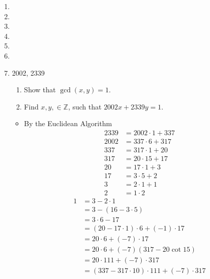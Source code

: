 \documentclass{article}
\begin{document}
\begin{enumerate}[label = \textbf{\alph*)}]
	\item
	\item
	\item
	\item
	\item
	\item
	\item 2002, 2339
	      \begin{enumerate}
		      \item Show that $ \gcd(x, y) = 1 $.
		      \item Find $ x, y, \in \mathbb{Z} $, such that $ 2002x + 2339y = 1 $.
	      \end{enumerate}
	      \begin{itemize}
		      \item By the Euclidean Algorithm
		            \begin{align*}
			            2339 & = 2002 \cdot 1 + 337 \\
			            2002 & = 337 \cdot 6 + 317  \\
			            337  & = 317 \cdot 1 + 20   \\
			            317  & = 20 \cdot 15 + 17   \\
			            20   & = 17 \cdot 1 + 3     \\
			            17   & = 3 \cdot 5 + 2      \\
			            3    & = 2 \cdot 1 + 1      \\
			            2    & = 1 \cdot 2
		            \end{align*}
		            \begin{align*}
			            1 & = 3 - 2 \cdot 1                                       \\
			              & = 3 - (16 - 3 \cdot 5)                                \\
			              & = 3 \cdot 6 - 17                                      \\
			              & = (20 - 17 \cdot 1) \cdot 6 + (-1) \cdot 17           \\
			              & = 20 \cdot 6 + (-7) \cdot 17                          \\
			              & = 20 \cdot 6 + (-7)(317 - 20 \cot 15)                 \\
			              & = 20 \cdot 111 + (-7) \cdot 317                       \\
			              & = (337 - 317 \cdot 10) \cdot 111 + (-7) \cdot 317     \\

\end{align*}
\end{itemize}
\end{enumerate}
\end{document}
